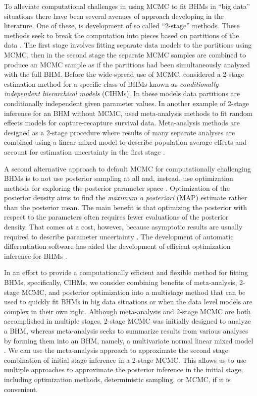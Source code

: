 \documentclass[12pt]{article}
\begin{document}
To alleviate computational challenges in using MCMC to fit BHMs in ``big data'' situations there have been several avenues of approach  developing in the literature. One of these, is development of so called ``2-stage'' methods. These methods seek to break the computation into pieces based on partitions of the data \citep{goudie2019joining, hooten2016hierarchical,hooten2018prior,lunn2013fully,mesquita2020embarrassingly}. The first stage involves fitting separate data models to the partitions using MCMC, then in the second stage the separate MCMC samples are combined to produce an MCMC sample as if the partitions had been simultaneously analyzed with the full BHM. Before the wide-spread use of MCMC, \cite{kass1989approximate} considered a 2-stage estimation method for a specific class of BHMs known as {\it conditionally independent hierarchical models} (CIHMs). In these models data partitions are conditionally independent given parameter values. In another example of 2-stage inference for an BHM without MCMC, \citet{burnham2002evaluation} used meta-analysis methods to fit random effects models for capture-recapture survival data. Meta-analysis methods are designed as a 2-stage procedure where results of many separate analyses are combined using a linear mixed model to describe population average effects and account for estimation uncertainty in the first stage \citep{gasparrini2012multivariate,higgins2009re}. 

A second alternative approach to default MCMC for computationally challenging BHMs is to not use posterior sampling at all and, instead, use  optimization methods for exploring the posterior parameter space \citep{green2015bayesian}. Optimization of the posterior density aims to find the  {\it maximum a posteriori} (MAP) estimate rather than the posterior mean. The main benefit is that optimizing the posterior with respect to the parameters often requires fewer evaluations of the posterior density. That comes at a cost, however, because asymptotic results are usually required to describe parameter uncertainty \citep{van2000asymptotic}. The development of automatic differentiation software has aided the development of efficient optimization inference for BHMs \citep{kristensen2016tmb, skaug2006automatic}.

In an effort to provide a computationally efficient and flexible method for fitting BHMs, specifically, CIHMs, we consider combining benefits of meta-analysis, 2-stage MCMC, and posterior optimization into a multistage method that can be used to quickly fit BHMs in big data situations or when the data level models are complex in their own right. Although meta-analysis and 2-stage MCMC are both accomplished in multiple stages, 2-stage MCMC was initially designed to analyze a BHM, whereas meta-analysis seeks to summarize results from various analyses by forming them into an BHM, namely, a multivariate normal linear mixed model \citep{gasparrini2012multivariate}. We can use the meta-analysis approach to approximate the second stage combination of initial stage inference in a 2-stage MCMC. This allows us to use multiple approaches  to approximate the posterior inference in the initial stage, including optimization methods, deterministic sampling, or MCMC, if it is convenient. 
\end{document}
